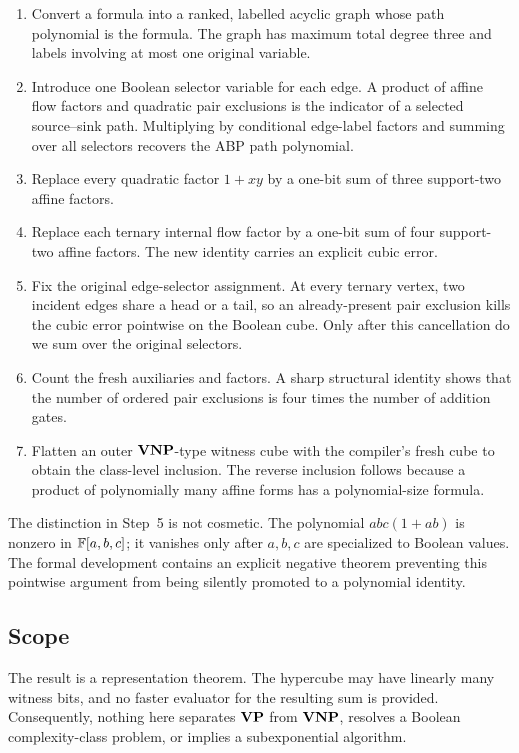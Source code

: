 \begin{enumerate}[label=\textbf{Step \arabic*.},leftmargin=2.2cm]
\item Convert a formula into a ranked, labelled acyclic graph whose path polynomial is the
formula.  The graph has maximum total degree three and labels involving at most one
original variable.
\item Introduce one Boolean selector variable for each edge.  A product of affine flow
factors and quadratic pair exclusions is the indicator of a selected source--sink path.
Multiplying by conditional edge-label factors and summing over all selectors recovers the
ABP path polynomial.
\item Replace every quadratic factor \(1+xy\) by a one-bit sum of three support-two affine
factors.
\item Replace each ternary internal flow factor by a one-bit sum of four support-two affine
factors.  The new identity carries an explicit cubic error.
\item Fix the original edge-selector assignment.  At every ternary vertex, two incident
edges share a head or a tail, so an already-present pair exclusion kills the cubic error
pointwise on the Boolean cube.  Only after this cancellation do we sum over the original
selectors.
\item Count the fresh auxiliaries and factors.  A sharp structural identity shows that the
number of ordered pair exclusions is four times the number of addition gates.
\item Flatten an outer \(\mathbf{VNP}\)-type witness cube with the compiler's fresh cube to obtain
the class-level inclusion.  The reverse inclusion follows because a product of
polynomially many affine forms has a polynomial-size formula.
\end{enumerate}

The distinction in Step~5 is not cosmetic.  The polynomial
\(abc(1+ab)\) is nonzero in \(\mathbb{F}[a,b,c]\); it vanishes only after \(a,b,c\) are specialized
to Boolean values.  The formal development contains an explicit negative theorem
preventing this pointwise argument from being silently promoted to a polynomial identity.

\subsection{Scope}

The result is a representation theorem.  The hypercube may have linearly many witness
bits, and no faster evaluator for the resulting sum is provided.  Consequently, nothing
here separates \(\mathbf{VP}\) from \(\mathbf{VNP}\), resolves a Boolean complexity-class problem, or
implies a subexponential algorithm.

